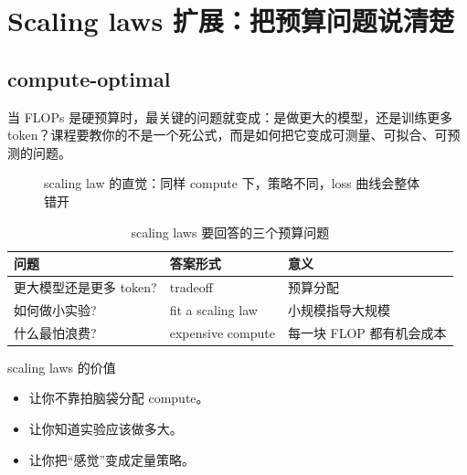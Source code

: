 \section{Scaling laws 扩展：把预算问题说清楚}

\subsection{compute-optimal}

当 FLOPs 是硬预算时，最关键的问题就变成：是做更大的模型，还是训练更多 token？课程要教你的不是一个死公式，而是如何把它变成可测量、可拟合、可预测的问题。

\begin{figure}[H]
\centering
{}
\caption{scaling law 的直觉：同样 compute 下，策略不同，loss 曲线会整体错开}
\end{figure}

\begin{table}[H]
\centering
\begin{tabular}{p{3.0cm}p{4.3cm}p{5.8cm}}
\toprule
\textbf{问题} & \textbf{答案形式} & \textbf{意义} \\
\midrule
更大模型还是更多 token? & tradeoff & 预算分配 \\
如何做小实验? & fit a scaling law & 小规模指导大规模 \\
什么最怕浪费? & expensive compute & 每一块 FLOP 都有机会成本 \\
\bottomrule
\end{tabular}
\caption{scaling laws 要回答的三个预算问题}
\end{table}

\begin{knowledgebox}{scaling laws 的价值}
\begin{itemize}
    \item 让你不靠拍脑袋分配 compute。
    \item 让你知道实验应该做多大。
    \item 让你把“感觉”变成定量策略。
\end{itemize}
\end{knowledgebox}

